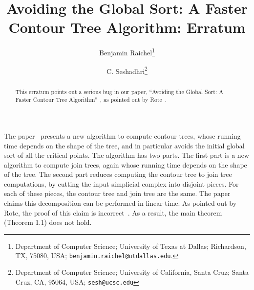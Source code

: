\documentclass[11pt]{article}
\theoremstyle{definition}
\newcommand{\si}[1]{#1}
\begin{document}
\author{
  Benjamin Raichel\thanks{%
      Department of Computer Science; %
      University of Texas at Dallas; %
      Richardson, TX, 75080, USA; %
      \texttt{\si{benjamin.raichel}@\si{utdallas}.\si{edu}}.
}
  \and
  C. Seshadhri\thanks{%
        Department of Computer Science; %
      University of California, Santa Cruz; %
      Santa Cruz, CA, 95064, USA; %
      \texttt{\si{sesh}@\si{ucsc}.\si{edu}} %
  }
}

\title{%
Avoiding the Global Sort: 
\break A Faster Contour Tree Algorithm: Erratum}

\date{}

\maketitle
\thispagestyle{empty}


\begin{abstract}
This erratum points out a serious bug in our paper, ``Avoiding the Global Sort: A Faster Contour Tree Algorithm"~\cite{rs-17},
as pointed out by Rote~\cite{rote}. 

\end{abstract}


The paper~\cite{rs-17} presents a new algorithm to compute contour trees, whose running time depends on the shape of the tree, and in particular avoids the initial global sort of all the critical points.  The algorithm has two parts. The first part 
is a new algorithm to compute join trees, again whose running time depends on the shape of the tree. The second part reduces computing the contour tree to join tree computations, by cutting the input simplicial complex into disjoint pieces. For each of these pieces, the contour tree and join tree are the same. The paper claims this decomposition can be performed in linear time. 
As pointed out by Rote, the proof of this claim is incorrect~\cite{rote}. As a result, the main theorem (Theorem 1.1) does not hold. 
\end{document}
